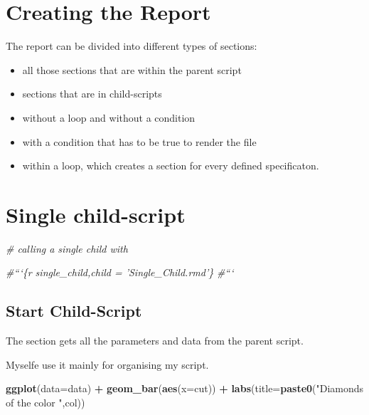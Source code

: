 \documentclass[12pt,]{article}
\newenvironment{Shaded}{\begin{snugshade}}{\end{snugshade}}
\newcommand{\KeywordTok}[1]{\textcolor[rgb]{0.13,0.29,0.53}{\textbf{#1}}}
\newcommand{\DataTypeTok}[1]{\textcolor[rgb]{0.13,0.29,0.53}{#1}}
\newcommand{\StringTok}[1]{\textcolor[rgb]{0.31,0.60,0.02}{#1}}
\newcommand{\CommentTok}[1]{\textcolor[rgb]{0.56,0.35,0.01}{\textit{#1}}}
\newcommand{\OperatorTok}[1]{\textcolor[rgb]{0.81,0.36,0.00}{\textbf{#1}}}
\newcommand{\NormalTok}[1]{#1}
\providecommand{\tightlist}{%
  \setlength{\itemsep}{0pt}\setlength{\parskip}{0pt}}
\begin{document}
\section{Creating the Report}\label{creating-the-report}

The report can be divided into different types of sections:

\begin{itemize}
\tightlist
\item
  all those sections that are within the parent script
\item
  sections that are in child-scripts
\item
  without a loop and without a condition
\item
  with a condition that has to be true to render the file
\item
  within a loop, which creates a section for every defined specificaton.
\end{itemize}

\section{Single child-script}\label{single-child-script}

\begin{Shaded}
\begin{Highlighting}[]
\CommentTok{# calling a single child with}

\CommentTok{#```\{r single_child,child = 'Single_Child.rmd'\}}
\CommentTok{#```}
\end{Highlighting}
\end{Shaded}

\subsection{Start Child-Script}\label{start-child-script}

The section gets all the parameters and data from the parent script.

Myselfe use it mainly for organising my script.

\begin{Shaded}
\begin{Highlighting}[]
  \KeywordTok{ggplot}\NormalTok{(}\DataTypeTok{data=}\NormalTok{data) }\OperatorTok{+}\StringTok{ }
\StringTok{  }\KeywordTok{geom_bar}\NormalTok{(}\KeywordTok{aes}\NormalTok{(}\DataTypeTok{x=}\NormalTok{cut)) }\OperatorTok{+}
\StringTok{  }\KeywordTok{labs}\NormalTok{(}\DataTypeTok{title=}\KeywordTok{paste0}\NormalTok{(}\StringTok{"Diamonds of the color "}\NormalTok{,col))}
\end{Highlighting}
\end{Shaded}
\end{document}
